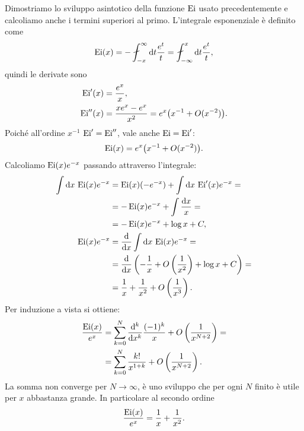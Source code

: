Dimostriamo lo sviluppo asintotico della funzione $\operatorname{Ei}$ usato precedentemente
e calcoliamo anche i termini superiori al primo.
L'integrale esponenziale è definito come
\begin{equation*}
	\operatorname{Ei}(x)
	= -\fint_{-x}^\infty \de t \frac{e^t}t
	= \fint_{-\infty}^x \de t \frac{e^t}t,
\end{equation*}
quindi le derivate sono
\begin{align*}
	\operatorname{Ei}'(x) &= \frac{e^x}x, \\
	\operatorname{Ei}''(x) &= \frac{xe^x - e^x}{x^2} = e^x \big(x^{-1} + O(x^{-2})\big).
\end{align*}
Poiché all'ordine $x^{-1}$ $\operatorname{Ei}'=\operatorname{Ei}''$, vale anche $\operatorname{Ei}=\operatorname{Ei}'$:
\begin{equation*}
	\operatorname{Ei}(x) = e^x \big(x^{-1} + O(x^{-2}) \big).
\end{equation*}
Calcoliamo $\operatorname{Ei}(x)e^{-x}$ passando attraverso l'integrale:
\begin{align*}
	\int\mathrm{d} x\, \operatorname{Ei}(x) e^{-x}
	&= \operatorname{Ei}(x)(-e^{-x}) + \int\mathrm{d} x\, \operatorname{Ei}'(x)e^{-x} = \\
	&= -\operatorname{Ei}(x)e^{-x}  + \int\frac{\mathrm{d} x}x = \\
	&= -\operatorname{Ei}(x)e^{-x} + \log x + C, \\
	\operatorname{Ei}(x)e^{-x}
	&= \frac{\mathrm{d} }{\mathrm{d} x} \int\mathrm{d} x\, \operatorname{Ei}(x)e^{-x} = \\
	&= \frac{\mathrm{d} }{\mathrm{d} x} \left( -\frac1x + O\left(\frac1{x^2}\right) + \log x + C \right) = \\
	&= \frac1x + \frac1{x^2} + O\left(\frac1{x^3}\right).
\end{align*}
Per induzione a vista si ottiene:
\begin{align*}
	\frac{\operatorname{Ei}(x)}{e^x}
	&= \sum_{k=0}^N \frac{\mathrm{d}^k}{\mathrm{d} x^k} \frac{(-1)^k}{x} + O\left(\frac1{x^{N+2}}\right) = \\
	&= \sum_{k=0}^N \frac{k!}{x^{1+k}} + O\left(\frac1{x^{N+2}}\right).
\end{align*}
La somma non converge per $N\to\infty$,
è uno sviluppo che per ogni $N$ finito è utile per $x$ abbastanza grande.
In particolare al secondo ordine
\begin{equation*}
	\frac{\operatorname{Ei}(x)}{e^x} = \frac1x + \frac1{x^2}.
\end{equation*}
